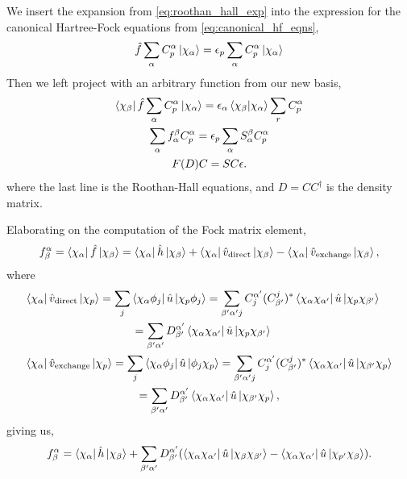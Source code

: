 We insert the expansion from \autoref{eq:roothan_hall_exp} into the expression 
for the canonical Hartree-Fock equations from \autoref{eq:canonical_hf_eqns},
\begin{equation}
    \hat{f}\sum_\alpha C^\alpha_p \ket{\chi_\alpha} = \epsilon_p \sum_\alpha C^\alpha_p \ket{\chi_\alpha}
\end{equation}
Then we left project with an arbitrary function from our new basis,
\begin{equation}
    \begin{gathered}
        \bra{\chi_\beta} \hat{f} \sum_\alpha C^\alpha_p \ket{\chi_\alpha}
            = \epsilon_\alpha \braket{\chi_\beta}{\chi_\alpha} \sum_r C^\alpha_p \\
        \sum_\alpha f^\beta_\alpha C^\alpha_p = \epsilon_p \sum_\alpha S^\beta_\alpha C^\alpha_p \\
        F(D) C = S C \epsilon.
    \end{gathered}
\end{equation}
where the last line is the Roothan-Hall equations, and $D=CC^\dagger$ is 
the density matrix.

Elaborating on the computation of the Fock matrix element,
\begin{equation}
    f^\alpha_\beta = \bra{\chi_\alpha} \hat{f} \ket{\chi_\beta}
        = \bra{\chi_\alpha} \hat{h} \ket{\chi_\beta} 
        + \bra{\chi_\alpha} \hat{v}_{\text{direct}} \ket{\chi_\beta}
        - \bra{\chi_\alpha} \hat{v}_{\text{exchange}} \ket{\chi_\beta},
\end{equation}
where
\begin{align}
    &\begin{gathered}
    \bra{\chi_\alpha} \hat{v}_{\text{direct}} \ket{\chi_p}
        = \sum_j \bra{\chi_\alpha \phi_j} \hat{u} \ket{\chi_p \phi_j} 
        = \sum_{\beta'\alpha'j} C^{\alpha'}_j (C^j_{\beta'})^*
            \bra{\chi_\alpha \chi_{\alpha'}} \hat{u} \ket{\chi_p \chi_{\beta'}} \\
        = \sum_{\beta'\alpha'} D^{\alpha'}_{\beta'} \bra{\chi_\alpha \chi_{\alpha'}} \hat{u} \ket{\chi_p \chi_{\beta'}}
    \end{gathered} \\
    &\begin{gathered}
    \bra{\chi_\alpha} \hat{v}_{\text{exchange}} \ket{\chi_p}
        = \sum_j \bra{\chi_\alpha \phi_j} \hat{u} \ket{\phi_j \chi_p} 
        = \sum_{\beta'\alpha'j} C^{\alpha'}_j (C^j_{\beta'})^* 
            \bra{\chi_\alpha \chi_{\alpha'}} \hat{u} \ket{\chi_{\beta'} \chi_p} \\
        = \sum_{\beta'\alpha'} D^{\alpha'}_{\beta'} \bra{\chi_\alpha \chi_{\alpha'}} \hat{u} \ket{\chi_{\beta'} \chi_p},  
    \end{gathered}
\end{align}
giving us,
\begin{equation}
    f^\alpha_\beta = \bra{\chi_\alpha}\hat{h} \ket{\chi_\beta} 
        + \sum_{\beta'\alpha'}D^{\alpha'}_{\beta'}(
            \bra{\chi_\alpha\chi_{\alpha'}}\hat{u} \ket{\chi_\beta\chi_{\beta'}}
            - \bra{\chi_\alpha\chi_{\alpha'}}\hat{u} \ket{\chi_{p'}\chi_\beta}
        ).
\end{equation}

